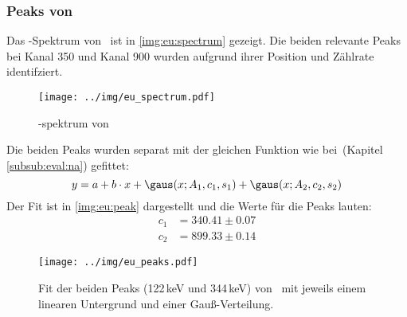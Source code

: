 \subsubsection{Peaks von \eu}
\label{subsub:eval:eu}
Das \textgamma-Spektrum von \eu\, ist in \autoref{img:eu:spectrum} gezeigt. Die beiden relevante Peaks bei Kanal 350 und Kanal 900 wurden aufgrund 
ihrer Position und Zählrate identifziert.
\begin{figure}[H]
\begin{center}
  \texttt{[image: ../img/eu\_spectrum.pdf]}
  \caption{\textgamma-spektrum von }
  \label{img:eu:spectrum}
\end{center}
\end{figure}
Die beiden Peaks wurden separat mit der gleichen Funktion wie bei \na\,(Kapitel \ref{subsub:eval:na}) gefittet:
\begin{equation}
  y = a + b\cdot x + \gaus(x; A_1, c_1, s_1) + \gaus(x; A_2, c_2, s_2)
\end{equation}
Der Fit ist in \autoref{img:eu:peak} dargestellt und die Werte für die Peaks lauten:
\begin{equation}
\begin{split}
  \label{eq:eu:peaks}
  c_1 &= 340.41 \pm 0.07 \\
  c_2 &= 899.33 \pm 0.14
\end{split}
\end{equation}
\begin{figure}[H]
\begin{center}
  \texttt{[image: ../img/eu\_peaks.pdf]}
  \caption{Fit der beiden Peaks (122\,keV und 344\,keV) von \eu\, mit jeweils einem linearen Untergrund und einer Gauß-Verteilung.}
  \label{img:eu:peak}
\end{center}
\end{figure}

